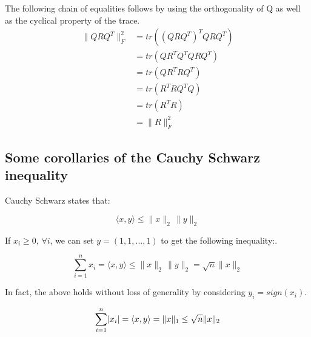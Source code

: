 \documentclass[paper=A4, fontsize=11pt]{scrartcl}
\let\originalleft\left
\let\originalright\right
\renewcommand{\left}{\mathopen{}\mathclose\bgroup\originalleft}
\renewcommand{\right}{\aftergroup\egroup\originalright}
\theoremstyle{remark}
\begin{document}
The following chain of equalities follows by using the orthogonality of
Q as well as the cyclical property of the trace.
\begin{equation}
\begin{aligned}
\|QRQ^{T} \|_{F}^{2}
& =  tr((QRQ^{T})^{T}QRQ^{T}) \\
& =  tr(QR^{T}Q^{T}QRQ^{T}) \\
& =  tr(QR^{T}RQ^{T}) \\
& =  tr(R^{T}RQ^{T}Q) \\
& =  tr(R^{T}R) \\
& =  \|R\|_{F}^{2} 
\end{aligned}
\end{equation}
	
\subsection{Some corollaries of the Cauchy Schwarz inequality} \label{sec:csi}

Cauchy Schwarz states that:

\begin{equation}
\langle x,y\rangle \leq \|x\|_{2} \, \|y\|_{2}
\end{equation}

If $x_i \geq 0, \, \forall i$, we can set $y= (1, 1, ..., 1)$ to get the following inequality:.

\begin{equation}
\sum_{i=1}^{n} x_{i} = \langle x,y\rangle  \leq  \|x\|_{2}\, \|y\|_{2} = \sqrt{n}\|x\|_{2}
\end{equation}

In fact, the above holds without loss of generality by considering $y_{i} = sign(x_{i})$. 

\begin{equation}
\sum_{i=1}^{n} \left|x_{i}\right| = \langle x,y\rangle =  \|x\|_{1}\leq \sqrt{n}\|x\|_{2}
\end{equation}	

\end{document}

